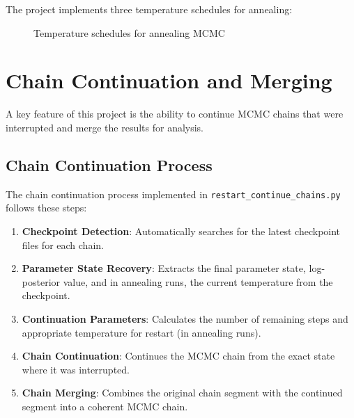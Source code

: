 \documentclass[11pt]{article}
\begin{document}
The project implements three temperature schedules for annealing:

\begin{figure}[H]
\centering
{}
\caption{Temperature schedules for annealing MCMC}
\label{fig:temp-schedules}
\end{figure}

\newpage

\section{Chain Continuation and Merging}

A key feature of this project is the ability to continue MCMC chains that were interrupted and merge the results for analysis.

\subsection{Chain Continuation Process}

The chain continuation process implemented in \texttt{restart\_continue\_chains.py} follows these steps:

\begin{enumerate}
    \item \textbf{Checkpoint Detection}: Automatically searches for the latest checkpoint files for each chain.
    \item \textbf{Parameter State Recovery}: Extracts the final parameter state, log-posterior value, and in annealing runs, the current temperature from the checkpoint.
    \item \textbf{Continuation Parameters}: Calculates the number of remaining steps and appropriate temperature for restart (in annealing runs).
    \item \textbf{Chain Continuation}: Continues the MCMC chain from the exact state where it was interrupted.
    \item \textbf{Chain Merging}: Combines the original chain segment with the continued segment into a coherent MCMC chain.
\end{enumerate}
\end{document}
